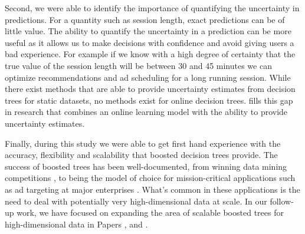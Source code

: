 Second, we were able to identify the importance of quantifying the uncertainty
in predictions. For a quantity such as session length, exact predictions can
be of little value.
The ability to quantify the uncertainty in a prediction can be more useful as
it allows us to make decisions with confidence and avoid giving users
a bad experience. 
For example if we know with a high degree of certainty
that the true value of the session length will be between 30 and 45 minutes
we can optimize recommendations and ad scheduling for a long running session.
While there exist methods that are able to provide uncertainty estimates
from decision trees for static datasets, no methods exist for online decision trees.
\uncertaintrees
fills this gap in research that combines an online learning model
with the ability to provide uncertainty estimates.

Finally, during this study we were able to get first hand experience with
the accuracy, flexibility and scalability that boosted decision trees
provide. The success of boosted trees has been well-documented,
from winning data mining competitions \cite{xgboost}, to being the model of choice for mission-critical
applications such as ad targeting at major enterprises \cite{mcrank, ctr-facebook}.
What's common in these applications is the need to deal with potentially very
high-dimensional data at scale.
In our follow-up work, we have focused on expanding the 
area of scalable boosted trees for high-dimensional data in Papers \boostvhtNum, and \blockgbtNum.